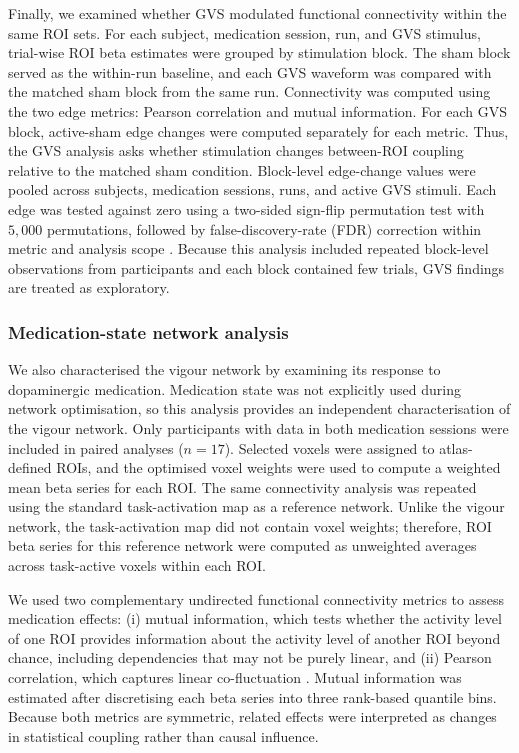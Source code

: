 \documentclass[utf8]{FrontiersinHarvard}
\begin{document}
Finally, we examined whether GVS modulated functional connectivity within the same ROI sets. For each subject, medication session, run, and GVS stimulus, trial-wise ROI beta estimates were grouped by stimulation block. The sham block served as the within-run baseline, and each GVS waveform was compared with the matched sham block from the same run. Connectivity was computed using the two edge metrics: Pearson correlation and mutual information. For each GVS block, active-sham edge changes were computed separately for each metric. Thus, the GVS analysis asks whether stimulation changes between-ROI coupling relative to the matched sham condition. Block-level edge-change values were pooled across subjects, medication sessions, runs, and active GVS stimuli. Each edge was tested against zero using a two-sided sign-flip permutation test with \(5{,}000\) permutations, followed by false-discovery-rate (FDR) correction within metric and analysis scope \citep{benjamini1995controlling}. Because this analysis included repeated block-level observations from participants and each block contained few trials, GVS findings are treated as exploratory.

\subsubsection{Medication-state network analysis}
We also characterised the vigour network by examining its response to dopaminergic medication. Medication state was not explicitly used during network optimisation, so this analysis provides an independent characterisation of the vigour network. Only participants with data in both medication sessions were included in paired analyses (\(n=17\)). Selected voxels were assigned to atlas-defined ROIs, and the optimised voxel weights were used to compute a weighted mean beta series for each ROI. The same connectivity analysis was repeated using the standard task-activation map as a reference network. Unlike the vigour network, the task-activation map did not contain voxel weights; therefore, ROI beta series for this reference network were computed as unweighted averages across task-active voxels within each ROI.

We used two complementary undirected functional connectivity metrics to assess medication effects: (i) mutual information, which tests whether the activity level of one ROI provides information about the activity level of another ROI beyond chance, including dependencies that may not be purely linear, and (ii) Pearson correlation, which captures linear co-fluctuation \citep{cover2006elements}. Mutual information was estimated after discretising each beta series into three rank-based quantile bins. Because both metrics are symmetric, related effects were interpreted as changes in statistical coupling rather than causal influence.
\end{document}
